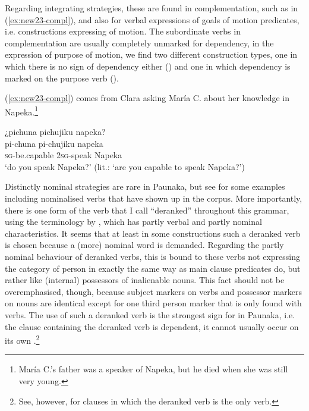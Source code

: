 Regarding integrating strategies, these are found in complementation, such as in (\ref{ex:new23-compl}), and also for verbal expressions of goals of motion predicates, i.e. constructions expressing  of motion. The subordinate verbs in complementation are usually completely unmarked for dependency, in the expression of purpose of motion, we find two different construction types, one in which there is no sign of dependency either () and one in which dependency is marked on the purpose verb (). 

(\ref{ex:new23-compl}) comes from Clara asking María C. about her knowledge in Napeka.\footnote{María C.’s father was a speaker of Napeka, but he died when she was still very young.}

\ea\label{ex:new23-compl}
\begingl
\glpreamble ¿pichuna pichujiku napeka?\\
\gla pi-chuna pi-chujiku napeka\\
\textsc{sg}-be.capable 2\textsc{sg}-speak Napeka\\
\glft ‘do you speak Napeka?’ (lit.: ‘are you capable to speak Napeka?’)
\endgl
\trailingcitation{[cux-c120414ls-2.272]}
\xe
{}


Distinctly nominal strategies are rare in Paunaka, but see  for some examples including nominalised verbs that have shown up in the corpus. More importantly, there is one form of the verb that I call “deranked” throughout this grammar, using the terminology by \citet[]{Cristofaro2003}, which has partly verbal and partly nominal characteristics. It seems that at least in some constructions such a deranked verb is chosen because a (more) nominal word is demanded. Regarding the partly nominal behaviour of deranked verbs, this is bound to these verbs not expressing the category of person in exactly the same way as main clause predicates do, but rather like (internal) possessors of inalienable nouns. This fact should not be overemphasised, though, because subject markers on verbs and possessor markers on nouns are identical except for one third person marker that is only found with verbs. The use of such a deranked verb is the strongest sign for  in Paunaka, i.e. the clause containing the deranked verb is dependent, it cannot usually occur on its own \citep[cf.][]{Lehmann1988}.\footnote{See, however,  for clauses in which the deranked verb is the only verb.}

